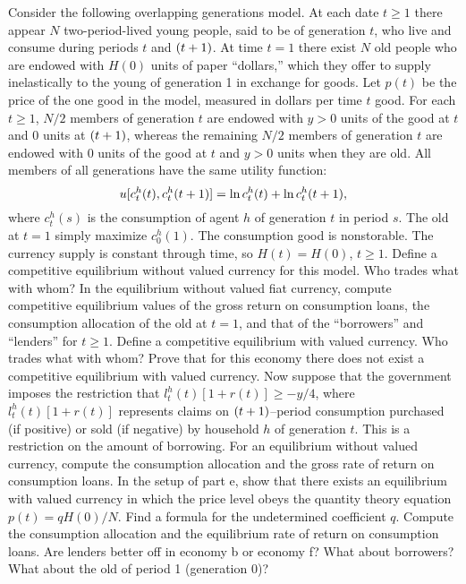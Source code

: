 \medskip
\noindent Consider the following overlapping generations model.  At each date $t\ge 1$
there appear $N$ two-period-lived young people, said to be of generation $t$,
who live and consume during periods $t$ and $({t+1})$.  At time $t=1$ there
exist $N$ old people who are endowed with $H(0)$ units of paper ``dollars,''
which they offer to supply inelastically to the young of generation 1 in
exchange for goods.  Let $p(t)$ be the price of the one good in the model,
measured in dollars per time $t$ good.  For each $t\ge 1$, $N/2$ members of
generation $t$ are endowed with $y>0$ units of the good at $t$ and 0 units at
$({t+1})$, whereas the remaining $N/2$ members of generation $t$ are endowed
with 0 units of the good at $t$ and $y>0$ units when they are old.  All members
of all generations have the same utility function:
$$u[c_t^h(t), c_t^h({t+1})]=\mathop{\hbox{ln}} c_t^h(t) +\mathop{\hbox{ln}} c_t^h({t+1}),$$
where $c_t^h(s)$ is the consumption of agent $h$ of generation $t$ in period
$s$.  The old at  $t=1$ simply maximize $c_0^h(1)$.  The consumption good is
nonstorable.  The currency supply is constant through time, so $H(t)=H(0)$,
$t\ge 1$.
\medskip
{} Define a competitive equilibrium without valued currency for this
model.  Who trades what with whom?
\medskip
{} In the equilibrium without valued fiat currency,
 compute   competitive equilibrium values of the
gross return on consumption loans, the consumption allocation of the old at
$t=1$, and that of the ``borrowers'' and ``lenders'' for $t\ge 1$.
\medskip
{} Define a competitive equilibrium with valued currency.  Who trades
what with whom?\medskip
{} Prove that for this economy there does not exist a competitive
equilibrium with valued currency.\medskip
{} Now suppose that the government imposes the restriction that
$l_t^h(t) [1+r(t)]\ge -y/4$, where $l_t^h(t)[1+r(t)]$ represents claims on
$({t+1})$--period consumption purchased (if positive) or sold (if negative) by
household $h$ of generation $t$.  This is a restriction on the amount of
borrowing.  For an equilibrium without valued currency, compute the consumption
allocation and the gross rate of return on consumption loans.
\medskip
{} In the setup of part  e,
 show that there exists an equilibrium with
valued currency in which the price level obeys the quantity theory equation
$p(t)=qH(0)/N$.  Find a formula for the undetermined coefficient $q$.  Compute
the consumption allocation and the equilibrium rate of return on consumption
loans.\medskip
{} Are lenders better off in economy b or economy f?  What about
borrowers?  What about the old of period 1 (generation 0)?
\medskip
{}
\medskip

